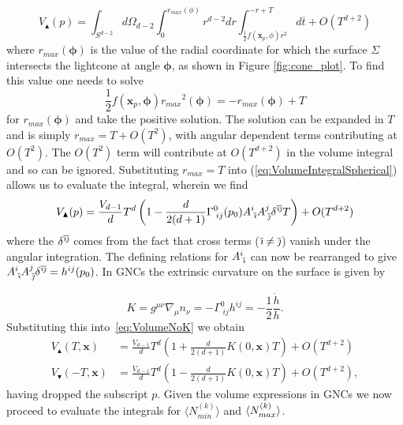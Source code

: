 \documentclass[12pt]{article}
\newcommand{\be}{\begin{equation}}
\newcommand{\ee}{\end{equation}}
\newcommand{\ibar}{{\overline{\emph\i}}}
\newcommand{\jbar}{{\overline{\emph\j}}}
\begin{document}
\be\label{eq:VolumeIntegralSpherical}
V_\blacktriangle(p)=\int_{S^{d-2}}
d\Omega_{d-2}
\int_{0}^{r_{max}(\phi)}r^{d-2}dr
\int_{\frac{1}{2}f(\mathbf{x}_p,\phi)r^2}^{-r+T}
d\overline{t}+O(T^{d+2})
\ee
where $r_{max}(\boldsymbol\phi)$ is the value of the radial coordinate for which the surface $\Sigma$ intersects the lightcone at angle $\boldsymbol\phi$, as shown in Figure \ref{fig:cone_plot}. To find this value one needs to solve 
\be
\frac{1}{2}f(\mathbf{x}_p,\boldsymbol\phi){r_{max}}^2(\boldsymbol\phi)=-r_{max}(\boldsymbol\phi)+T
\ee 
for $r_{max}(\boldsymbol\phi)$ and take the positive solution. The solution can be expanded in $T$ and is simply $r_{max}=T+O(T^2)$, with angular dependent terms contributing at $O(T^2)$. The $O(T^2)$ term will contribute at $O(T^{d+2})$ in the volume integral and so can be ignored. Substituting $r_{max}=T$ into (\ref{eq:VolumeIntegralSpherical}) allows us to evaluate the integral, wherein we find 
\be\label{eq:VolumeNoK}
V_\blacktriangle(p)
=\frac{V_{d-1}}{d}T^d\left(1-\frac{d}{2(d+1)}\Gamma^{0}_{\;ij}(p_0)A^{i}_{\;\ibar}A^{j}_{\;\jbar}\delta^{\ibar\jbar}T\right)
+O(T^{d+2})
\ee
where the $\delta^{\ibar\jbar}$ comes from the fact that cross terms ($\ibar\neq \jbar$) vanish under the angular integration. The defining relations for $A^{i}_{\;\ibar}$ can now be rearranged to give $A^{i}_{\;\ibar}A^{j}_{\;\jbar}\delta^{\ibar\jbar}=h^{ij}(p_0)$. In GNCs the extrinsic curvature on the surface is given by

\be\label{eq:K}
K
=g^{\mu\nu }\nabla_{\mu}n_{\nu}
=-\Gamma^{0}_{\;ij}h^{ij}=-\frac{1}{2}\frac{\dot{h}}{h}.
\ee
Substituting this into~\eqref{eq:VolumeNoK} we obtain 
\begin{align}
V_\blacktriangle(T,\mathbf x)
&=\frac{V_{d-1}}{d}T^d\left(1+\frac{d}{2(d+1)}K(0,\mathbf{x})T\right)
+O(T^{d+2}) \label{eq:TopVolumeWithK}\\
V_\blacktriangledown(-T,\mathbf x)
&=\frac{V_{d-1}}{d}T^d\left(1-\frac{d}{2(d+1)}K(0,\mathbf{x})T\right)
+O(T^{d+2}), \label{eq:BottomVolumeWithK}
\end{align}
having dropped the subscript $p$. Given the volume expressions in GNCs we now proceed to evaluate the integrals for $\langle N_{min}^{(k)}\rangle $ and $\langle N_{\vphantom{i}max}^{(k)}\rangle$.
\end{document}
